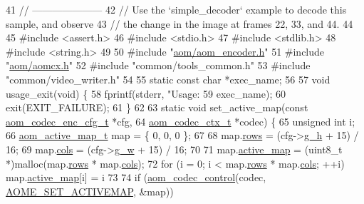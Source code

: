\begin{DoxyCodeInclude}
41 \textcolor{comment}{// ---------------------}
42 \textcolor{comment}{// Use the `simple\_decoder` example to decode this sample, and observe}
43 \textcolor{comment}{// the change in the image at frames 22, 33, and 44.}
44 
45 \textcolor{preprocessor}{#include <assert.h>}
46 \textcolor{preprocessor}{#include <stdio.h>}
47 \textcolor{preprocessor}{#include <stdlib.h>}
48 \textcolor{preprocessor}{#include <string.h>}
49 
50 \textcolor{preprocessor}{#include "\hyperlink{aom__encoder_8h}{aom/aom\_encoder.h}"}
51 \textcolor{preprocessor}{#include "\hyperlink{aomcx_8h}{aom/aomcx.h}"}
52 \textcolor{preprocessor}{#include "common/tools\_common.h"}
53 \textcolor{preprocessor}{#include "common/video\_writer.h"}
54 
55 \textcolor{keyword}{static} \textcolor{keyword}{const} \textcolor{keywordtype}{char} *exec\_name;
56 
57 \textcolor{keywordtype}{void} usage\_exit(\textcolor{keywordtype}{void}) \{
58   fprintf(stderr, \textcolor{stringliteral}{"Usage: %
59           exec\_name);
60   exit(EXIT\_FAILURE);
61 \}
62 
63 \textcolor{keyword}{static} \textcolor{keywordtype}{void} set\_active\_map(\textcolor{keyword}{const} \hyperlink{structaom__codec__enc__cfg}{aom\_codec\_enc\_cfg\_t} *cfg,
64                            \hyperlink{structaom__codec__ctx}{aom\_codec\_ctx\_t} *codec) \{
65   \textcolor{keywordtype}{unsigned} \textcolor{keywordtype}{int} i;
66   \hyperlink{structaom__active__map}{aom\_active\_map\_t} map = \{ 0, 0, 0 \};
67 
68   map.\hyperlink{structaom__active__map_a0d7ce0e1050137bf9b88e8649ea7aec2}{rows} = (cfg->\hyperlink{structaom__codec__enc__cfg_a37b0f57b63bec8d133df8901d4407ee6}{g\_h} + 15) / 16;
69   map.\hyperlink{structaom__active__map_a3a105e0d8f2643cdc542e2f078b9e6b2}{cols} = (cfg->\hyperlink{structaom__codec__enc__cfg_a80cb459c5ef3c7e1516f617c4c9d6eab}{g\_w} + 15) / 16;
70 
71   map.\hyperlink{structaom__active__map_a8916917bce716b1d954a9f476d98142e}{active\_map} = (uint8\_t *)malloc(map.\hyperlink{structaom__active__map_a0d7ce0e1050137bf9b88e8649ea7aec2}{rows} * map.\hyperlink{structaom__active__map_a3a105e0d8f2643cdc542e2f078b9e6b2}{cols});
72   \textcolor{keywordflow}{for} (i = 0; i < map.\hyperlink{structaom__active__map_a0d7ce0e1050137bf9b88e8649ea7aec2}{rows} * map.\hyperlink{structaom__active__map_a3a105e0d8f2643cdc542e2f078b9e6b2}{cols}; ++i) map.\hyperlink{structaom__active__map_a8916917bce716b1d954a9f476d98142e}{active\_map}[i] = i %
73 
74   if (\hyperlink{group__codec_ga6da974f4eeaba1fa74106b28d0fe6ac5}{aom\_codec\_control}(codec, \hyperlink{group__aom__encoder_ggae78dde67a6d78f332e9bdba0dde42db5a709937e1e0eb160e49720e6fd5164d1e}{AOME\_SET\_ACTIVEMAP}, &map))
}
\end{DoxyCodeInclude}
